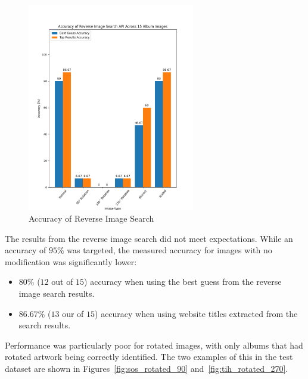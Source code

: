\begin{figure} [H]
    \centering
    \includegraphics[width=0.65\textwidth]{figures/evaluation_graphs_ris.png}
    \caption{Accuracy of Reverse Image Search}
    \label{fig:album-scanning-results-ris}
\end{figure}

The results from the reverse image search did not meet expectations. While an accuracy of $95\%$ was targeted, the measured accuracy for images with no modification was significantly lower:
\begin{itemize}
    \item $80\%$ ($12$ out of $15$) accuracy when using the best guess from the reverse image search results.
    \item $86.67\%$ ($13$ our of $15$) accuracy when using website titles extracted from the search results.
\end{itemize}

Performance was particularly poor for rotated images, with only albums that had rotated artwork being correctly identified. The two examples of this in the test dataset are shown in Figures~\ref{fig:sos_rotated_90} and~\ref{fig:tih_rotated_270}.

